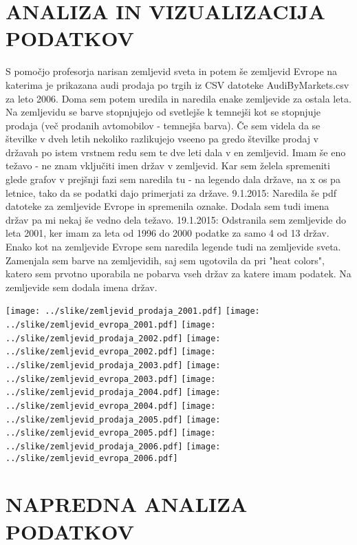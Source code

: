 \documentclass[11pt,a4paper]{article}
\begin{document}
\section{ANALIZA IN VIZUALIZACIJA PODATKOV}
S pomočjo profesorja narisan zemljevid sveta in potem še zemljevid Evrope na katerima je prikazana audi prodaja po trgih iz CSV datoteke AudiByMarkets.csv za leto 2006. Doma sem potem uredila in naredila enake zemljevide za ostala leta. Na zemljevidu se barve stopnjujejo od svetlejše k temnejši kot se stopnjuje prodaja (več prodanih avtomobilov - temnejša barva). Če sem videla da se številke v dveh letih nekoliko razlikujejo vseeno pa gredo številke prodaj v državah po istem vrstnem redu sem te dve leti dala v en zemljevid. Imam še eno težavo - ne znam vključiti imen držav v zemljevid. Kar sem želela spremeniti glede grafov v prejšnji fazi sem naredila tu - na legendo dala države, na x os pa letnice, tako da se podatki dajo primerjati za države.
9.1.2015: Naredila še pdf datoteke za zemljevide Evrope in spremenila oznake. Dodala sem tudi imena držav pa mi nekaj še vedno dela težavo.
19.1.2015: Odstranila sem zemljevide do leta 2001, ker imam za leta od 1996 do 2000 podatke za samo 4 od 13 držav. Enako kot na zemljevide Evrope sem naredila legende tudi na zemljevide sveta. Zamenjala sem barve na zemljevidih, saj sem ugotovila da pri "heat colors", katero sem prvotno uporabila ne pobarva vseh držav za katere imam podatek. Na zemljevide sem dodala imena držav. 


\texttt{[image: ../slike/zemljevid\_prodaja\_2001.pdf]}
\texttt{[image: ../slike/zemljevid\_evropa\_2001.pdf]}
\texttt{[image: ../slike/zemljevid\_prodaja\_2002.pdf]}
\texttt{[image: ../slike/zemljevid\_evropa\_2002.pdf]}
\texttt{[image: ../slike/zemljevid\_prodaja\_2003.pdf]}
\texttt{[image: ../slike/zemljevid\_evropa\_2003.pdf]}
\texttt{[image: ../slike/zemljevid\_prodaja\_2004.pdf]}
\texttt{[image: ../slike/zemljevid\_evropa\_2004.pdf]}
\texttt{[image: ../slike/zemljevid\_prodaja\_2005.pdf]}
\texttt{[image: ../slike/zemljevid\_evropa\_2005.pdf]}
\texttt{[image: ../slike/zemljevid\_prodaja\_2006.pdf]}
\texttt{[image: ../slike/zemljevid\_evropa\_2006.pdf]}

\section{NAPREDNA ANALIZA PODATKOV}
\end{document}
